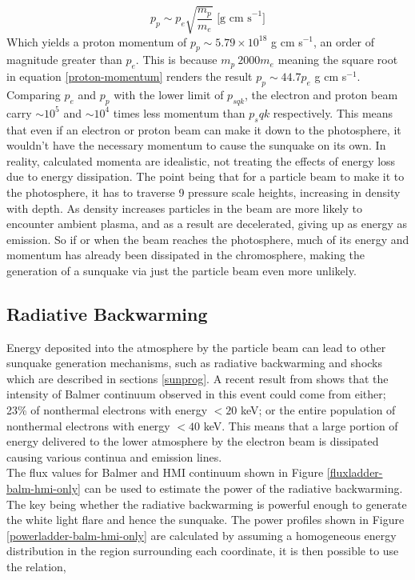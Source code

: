 \begin{equation}\label{proton-momentum}
p_p \sim p_e \sqrt{\frac{m_p}{m_e}} \text{ [g cm s}^{-1}]
\end{equation}
\noindent
Which yields a proton momentum of $p_p \sim 5.79{\times}10^18$ g cm s$^{-1}$, an order of magnitude greater than $p_e$. This is because $m_p ~ 2000m_e$ meaning the square root in equation \ref{proton-momentum} renders the result $p_p \sim 44.7p_e$ g cm s$^{-1}$. Comparing $p_{e}$ and $p_{p}$ with the lower limit of $p_{sqk}$, the electron and proton beam carry $\sim 10^{5}$ and $\sim 10^{4}$ times less momentum than $p_sqk$ respectively. This means that even if an electron or proton beam can make it down to the photosphere, it wouldn't have the necessary momentum to cause the sunquake on its own. In reality, calculated momenta are idealistic, not treating the effects of energy loss due to energy dissipation. The point being that for a particle beam to make it to the photosphere, it has to traverse 9 pressure scale heights, increasing in density with depth. As density increases particles in the beam are more likely to encounter ambient plasma, and as a result are decelerated, giving up as energy as emission. So if or when the beam reaches the photosphere, much of its energy and momentum has already been dissipated in the chromosphere, making the generation of a sunquake via just the particle beam even more unlikely. \\

\subsection{Radiative Backwarming}
Energy deposited into the atmosphere by the particle beam can lead to other sunquake generation mechanisms, such as radiative backwarming and shocks which are described in sections \ref{sunprog}. A recent result from \cite{2016ApJ...816...88K} shows that the intensity of Balmer continuum observed in this event could come from either; 23\% of nonthermal electrons with energy $<20$ keV; or the entire population of nonthermal electrons with energy $<40$ keV. This means that a large portion of energy delivered to the lower atmosphere by the electron beam is dissipated causing various continua and emission lines. \\
\noindent
The flux values for Balmer and HMI continuum shown in Figure \ref{fluxladder-balm-hmi-only} can be used to estimate the power of the radiative backwarming. The key being whether the radiative backwarming is powerful enough to generate the white light flare and hence the sunquake. The power profiles shown in Figure \ref{powerladder-balm-hmi-only} are calculated by assuming a homogeneous energy distribution in the region surrounding each coordinate, it is then possible to use the relation,

